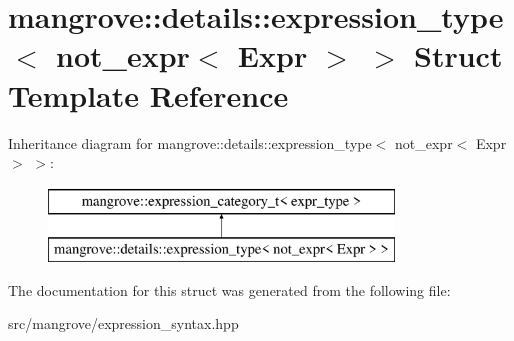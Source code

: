 \hypertarget{structmangrove_1_1details_1_1expression__type_3_01not__expr_3_01Expr_01_4_01_4}{}\section{mangrove\+:\+:details\+:\+:expression\+\_\+type$<$ not\+\_\+expr$<$ Expr $>$ $>$ Struct Template Reference}
\label{structmangrove_1_1details_1_1expression__type_3_01not__expr_3_01Expr_01_4_01_4}
Inheritance diagram for mangrove\+:\+:details\+:\+:expression\+\_\+type$<$ not\+\_\+expr$<$ Expr $>$ $>$\+:\begin{figure}[H]
\begin{center}
\leavevmode
\includegraphics[height=2.000000cm]{structmangrove_1_1details_1_1expression__type_3_01not__expr_3_01Expr_01_4_01_4}
\end{center}
\end{figure}


The documentation for this struct was generated from the following file\+:\begin{DoxyCompactItemize}
\item 
src/mangrove/expression\+\_\+syntax.\+hpp\end{DoxyCompactItemize}
